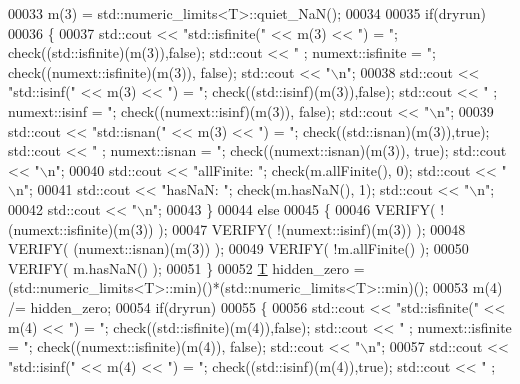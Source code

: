 \begin{DoxyCode}
00033   m(3) = std::numeric\_limits<T>::quiet\_NaN();
00034 
00035   \textcolor{keywordflow}{if}(dryrun)
00036   \{
00037     std::cout << \textcolor{stringliteral}{"std::isfinite("} << m(3) << \textcolor{stringliteral}{") = "}; check((std::isfinite)(m(3)),\textcolor{keyword}{false}); std::cout << \textcolor{stringliteral}{"  ;
       numext::isfinite = "}; check((numext::isfinite)(m(3)), \textcolor{keyword}{false}); std::cout << \textcolor{stringliteral}{"\(\backslash\)n"};
00038     std::cout << \textcolor{stringliteral}{"std::isinf("} << m(3) << \textcolor{stringliteral}{")    = "}; check((std::isinf)(m(3)),\textcolor{keyword}{false});    std::cout << \textcolor{stringliteral}{"  ;
       numext::isinf    = "}; check((numext::isinf)(m(3)), \textcolor{keyword}{false}); std::cout << \textcolor{stringliteral}{"\(\backslash\)n"};
00039     std::cout << \textcolor{stringliteral}{"std::isnan("} << m(3) << \textcolor{stringliteral}{")    = "}; check((std::isnan)(m(3)),\textcolor{keyword}{true});     std::cout << \textcolor{stringliteral}{"  ;
       numext::isnan    = "}; check((numext::isnan)(m(3)), \textcolor{keyword}{true}); std::cout << \textcolor{stringliteral}{"\(\backslash\)n"};
00040     std::cout << \textcolor{stringliteral}{"allFinite: "}; check(m.allFinite(), 0); std::cout << \textcolor{stringliteral}{"\(\backslash\)n"};
00041     std::cout << \textcolor{stringliteral}{"hasNaN:    "}; check(m.hasNaN(), 1);    std::cout << \textcolor{stringliteral}{"\(\backslash\)n"};
00042     std::cout << \textcolor{stringliteral}{"\(\backslash\)n"};
00043   \}
00044   \textcolor{keywordflow}{else}
00045   \{
00046     VERIFY( !(numext::isfinite)(m(3)) );
00047     VERIFY( !(numext::isinf)(m(3)) );
00048     VERIFY(  (numext::isnan)(m(3)) );
00049     VERIFY( !m.allFinite() );
00050     VERIFY(  m.hasNaN() );
00051   \}
00052   \hyperlink{group___sparse_core___module}{T} hidden\_zero = (std::numeric\_limits<T>::min)()*(std::numeric\_limits<T>::min)();
00053   m(4) /= hidden\_zero;
00054   \textcolor{keywordflow}{if}(dryrun)
00055   \{
00056     std::cout << \textcolor{stringliteral}{"std::isfinite("} << m(4) << \textcolor{stringliteral}{") = "}; check((std::isfinite)(m(4)),\textcolor{keyword}{false}); std::cout << \textcolor{stringliteral}{"  ;
       numext::isfinite = "}; check((numext::isfinite)(m(4)), \textcolor{keyword}{false}); std::cout << \textcolor{stringliteral}{"\(\backslash\)n"};
00057     std::cout << \textcolor{stringliteral}{"std::isinf("} << m(4) << \textcolor{stringliteral}{")    = "}; check((std::isinf)(m(4)),\textcolor{keyword}{true});     std::cout << \textcolor{stringliteral}{"  ;
}
\end{DoxyCode}
